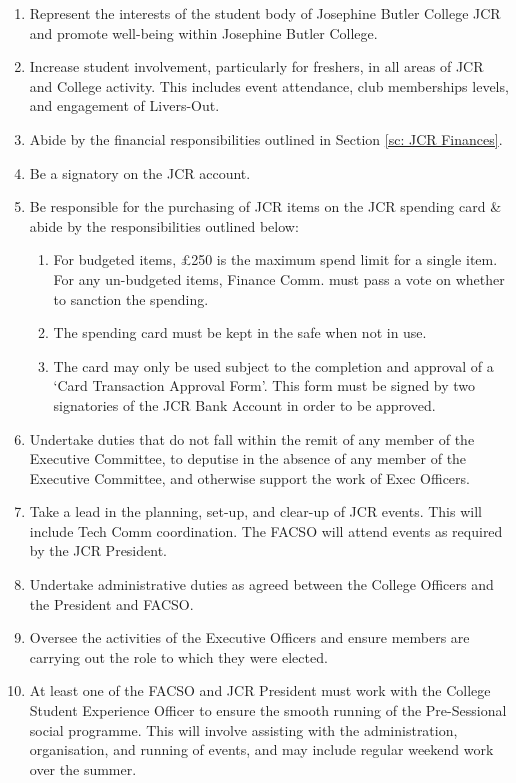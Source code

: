 \begin{enumerate}
    \item Represent the interests of the student body of Josephine Butler College JCR and promote well-being within Josephine Butler College.
    \item Increase student involvement, particularly for freshers, in all areas of JCR and College activity. This includes event attendance, club memberships levels, and engagement of Livers-Out.
    \item Abide by the financial responsibilities outlined in Section \ref{sc: JCR Finances}.
    \item Be a signatory on the JCR account.
    \item Be responsible for the purchasing of JCR items on the JCR spending card \& abide by the responsibilities outlined below:
    \begin{enumerate}
        \item For budgeted items, £250 is the maximum spend limit for a single item. For any un-budgeted items, Finance Comm. must pass a vote on whether to sanction the spending.
        \item The spending card must be kept in the safe when not in use.
        \item The card may only be used subject to the completion and approval of a ‘Card Transaction Approval Form’. This form must be signed by two signatories of the JCR Bank Account in order to be approved.
    \end{enumerate}
    \item Undertake duties that do not fall within the remit of any member of the Executive Committee, to deputise in the absence of any member of the Executive Committee, and otherwise support the work of Exec Officers. 
    \item Take a lead in the planning, set-up, and clear-up of JCR events. This will include Tech Comm coordination. The FACSO will attend events as required by the JCR President.
    \item Undertake administrative duties as agreed between the College Officers and the President and FACSO. 
    \item Oversee the activities of the Executive Officers and ensure members are carrying out the role to which they were elected.
    \item At least one of the FACSO and JCR President must work with the College Student Experience Officer to ensure the smooth running of the Pre-Sessional social programme. This will involve assisting with the administration, organisation, and running of events, and may include regular weekend work over the summer.

\end{enumerate}
